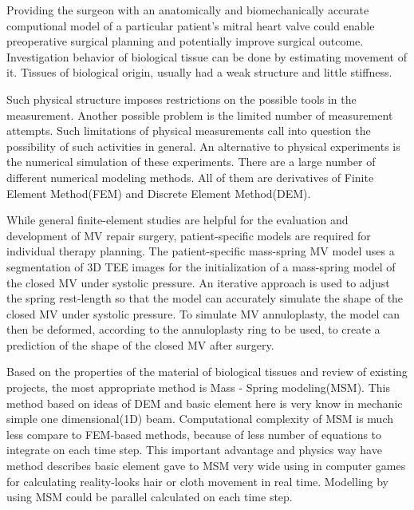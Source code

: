 Providing the surgeon with an anatomically and biomechanically accurate
computional model of a particular patient's mitral heart valve could enable
preoperative surgical planning and potentially improve surgical outcome.
Investigation behavior of biological tissue can be done by estimating movement
of it. Tissues of biological origin, usually had a weak structure and little
stiffness.
\par
Such physical structure imposes restrictions on the possible tools in the
measurement. Another possible problem is the limited number of measurement
attempts. Such limitations of physical measurements call into question the
possibility of such activities in general. An alternative to physical
experiments is the numerical simulation of these experiments. There are a large
number of different numerical modeling methods. All of them are derivatives of
Finite Element Method(FEM) and Discrete Element Method(DEM).
\par
While general finite-element studies are helpful for the evaluation and
development of MV repair surgery, patient-specific models are required for
individual therapy planning.
The patient-specific mass-spring MV model uses a segmentation of 3D TEE images
for the initialization of a mass-spring model of the closed MV under systolic
pressure. An iterative approach is used to adjust the spring rest-length so that
the model can accurately simulate the shape of the closed MV under systolic
pressure. To simulate MV annuloplasty, the model can then be deformed, according
to the annuloplasty ring to be used, to create a prediction of the shape of the
closed MV after surgery.
\par
Based on the properties of the material of biological tissues and review of
existing projects, the most appropriate method is Mass - Spring modeling(MSM). This
method based on ideas of DEM and basic element here is very know in mechanic
simple one dimensional(1D) beam.
Computational complexity of MSM is much less compare to FEM-based methods,
because of less number of equations to integrate on each time step. This
important advantage and physics way have method describes basic element gave to
MSM very wide using in computer games for calculating reality-looks hair or
cloth movement in real time. Modelling by using MSM could be parallel calculated
on each time step.\cite{Rasmusson2008} \cite{Amorim2012}
\par
